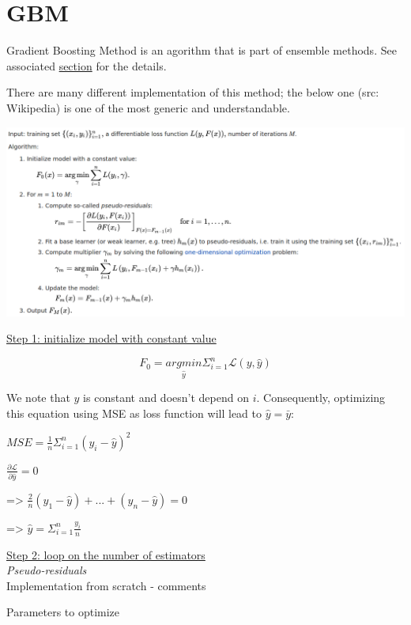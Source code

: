 \section*{GBM}

Gradient Boosting Method is an agorithm that is part of ensemble methods. See associated \hyperref[sec:ensemble-methods]{section} for the details.

There are many different implementation of this method; the below one (src: Wikipedia) is one of the most generic and understandable.

\begin{center}
\includegraphics[scale=0.3]{GBM_algo.png}
\end{center}

\underline{Step 1: initialize model with constant value}

$$F_0 = \underset{\hat y}{argmin} \Sigma_{i=1}^n \mathcal{L}(y,\hat y)$$

We note that $\hat y$ is constant and doesn't depend on $i$. Consequently, optimizing this equation using MSE as loss function will lead to $\hat y = \bar y$:

$MSE = \frac{1}{n}\Sigma_{i=1}^n (y_i - \hat y)^2$

$\frac{\partial \mathcal{L}}{\partial \hat y} = 0$

=> $\frac{2}{n}(y_1 - \hat y) + ... + (y_n - \hat y) = 0$

=> $\hat y = \Sigma_{i=1}^n \frac{y_i}{n}$

\underline{Step 2: loop on the number of estimators} \\

\textit{Pseudo-residuals} \\






Implementation from scratch - comments

Parameters to optimize

\vspace{5mm}